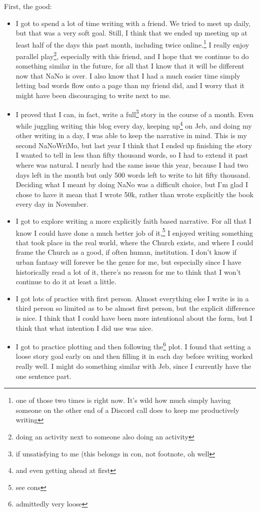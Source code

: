 \documentclass[12pt]{article}[titlepage]
\newcommand{\1}{\={a}}
\newcommand{\2}{\={e}}
\newcommand{\3}{\={\i}}
\newcommand{\4}{\=o}
\newcommand{\5}{\=u}
\newcommand{\6}{\={A}}
\renewcommand{\,}{\textsuperscript{,}}
\begin{document}
First, the good:
\begin{itemize}
\item I got to spend a lot of time writing with a friend. We tried to meet up daily, but that was a very soft goal.
Still, I think that we ended up meeting up at least half of the days this past month, including twice online.\footnote{one of those two times is right now.
It's wild how much simply having someone on the other end of a Discord call does to keep me productively writing}
I really enjoy parallel play\footnote{doing an activity next to someone also doing an activity}, especially with this friend, and I hope that we continue to do something similar in the future, for all that I know that it will be different now that NaNo is over.
I also know that I had a much easier time simply letting bad words flow onto a page than my friend did, and I worry that it might have been discouraging to write next to me.
\item I proved that I can, in fact, write a full\footnote{if unsatisfying to me (this belongs in con, not footnote, oh well} story in the course of a month.
Even while juggling writing this blog every day, keeping up\footnote{and even getting ahead at first} on Jeb, and doing my other writing in a day, I was able to keep the narrative in mind.
This is my second NaNoWriMo, but last year I think that I ended up finishing the story I wanted to tell in less than fifty thousand words, so I had to extend it past where was natural.
I nearly had the same issue this year, because I had two days left in the month but only 500 words left to write to hit fifty thousand.
Deciding what I meant by doing NaNo was a difficult choice, but I'm glad I chose to have it mean that I wrote 50k, rather than wrote explicitly the book every day in November. 
\item I got to explore writing a more explicitly faith based narrative.
For all that I know I could have done a much better job of it,\footnote{see cons} I enjoyed writing something that took place in the real world, where the Church exists, and where I could frame the Church as a good, if often human, institution.
I don't know if urban fantasy will forever be the genre for me, but especially since I have historically read a lot of it, there's no reason for me to think that I won't continue to do it at least a little. 
\item I got lots of practice with first person. Almost everything else I write is in a third person so limited as to be almost first person, but the explicit difference is nice.
I think that I could have been more intentional about the form, but I think that what intention I did use was nice. 
\item I got to practice plotting and then following the\footnote{admittedly very loose} plot.
I found that setting a loose story goal early on and then filling it in each day before writing worked really well.
I might do something similar with Jeb, since I currently have the one sentence part. 
\end{itemize}
 
\end{document}
